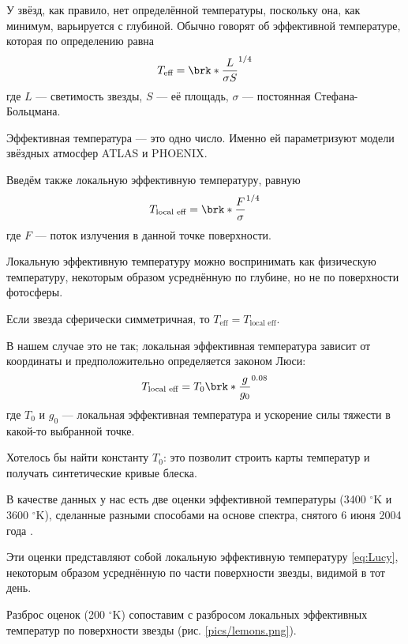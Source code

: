 \label{sect:temperature}

У звёзд, как правило, нет определённой температуры, поскольку она, как минимум, варьируется с глубиной. Обычно говорят об эффективной температуре, которая по определению равна
\begin{equation}
T_\text{eff} = \brk*{\frac{L}{\sigma S}}^{1/4}
\label{eq:Teff}
\end{equation}
где $L$ --- светимость звезды, $S$ --- её площадь, $\sigma$ --- постоянная Стефана-Больцмана.

Эффективная температура --- это одно число. Именно ей параметризуют модели звёздных атмосфер ATLAS и PHOENIX.

Введём также локальную эффективную температуру, равную
\begin{equation}
T_\text{local eff} = \brk*{\frac{F}{\sigma}}^{1/4}
\label{eq:Tlocaleff}
\end{equation}
где $F$ --- поток излучения в данной точке поверхности.

Локальную эффективную температуру можно воспринимать как физическую температуру, некоторым образом усреднённую по глубине, но не по поверхности фотосферы.

Если звезда сферически симметричная, то $T_\text{eff} = T_\text{local eff}$.

В нашем случае это не так; локальная эффективная температура зависит от координаты и предположительно определяется законом Люси:
\begin{equation}
T_\text{local eff} = T_0 \brk*{\frac{g}{g_0}}^{0.08}
\label{eq:Lucy}
\end{equation}
где $T_0$ и $g_0$ --- локальная эффективная температура и ускорение силы тяжести в какой-то выбранной точке.

Хотелось бы найти константу $T_0$: это позволит строить карты температур и получать синтетические кривые блеска.

В качестве данных у нас есть две оценки эффективной температуры (3400 ${}^\circ$K и 3600 ${}^\circ$K), сделанные разными способами на основе спектра, снятого 6 июня 2004 года \cite{TCRBtemperature}.

Эти оценки представляют собой локальную эффективную температуру \eqref{eq:Lucy}, некоторым образом усреднённую по части поверхности звезды, видимой в тот день.

Разброс оценок (200 ${}^\circ$K) сопоставим с разбросом локальных эффективных температур по поверхности звезды (рис. \ref{pics/lemons.png}).

